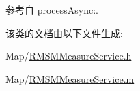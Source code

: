 参考自 process\-Async\-:.



该类的文档由以下文件生成\-:\begin{DoxyCompactItemize}
\item 
Map/\hyperlink{_r_m_s_m_measure_service_8h}{R\-M\-S\-M\-Measure\-Service.\-h}\item 
Map/\hyperlink{_r_m_s_m_measure_service_8m}{R\-M\-S\-M\-Measure\-Service.\-m}\end{DoxyCompactItemize}
